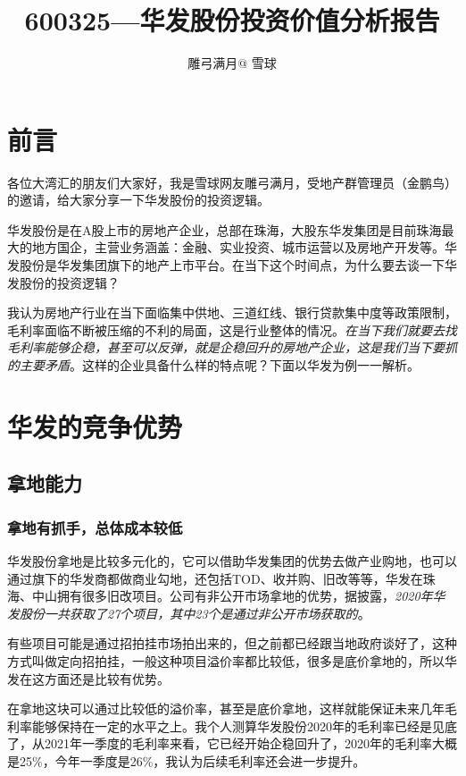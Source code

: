 \documentclass[a4paper,12pt,lang=cn,fontset = windows]{elegantpaper} %
\title{600325—华发股份投资价值分析报告} %
\author{雕弓满月@ 雪球}
\date{\zhtoday}
\begin{document}
\maketitle
\section{前言}

各位大湾汇的朋友们大家好，我是雪球网友雕弓满月，受地产群管理员（金鹏鸟）的邀请，给大家分享一下华发股份的投资逻辑。

华发股份是在A股上市的房地产企业，总部在珠海，大股东华发集团是目前珠海最大的地方国企，主营业务涵盖：金融、实业投资、城市运营以及房地产开发等。华发股份是华发集团旗下的地产上市平台。在当下这个时间点，为什么要去谈一下华发股份的投资逻辑？

我认为房地产行业在当下面临集中供地、三道红线、银行贷款集中度等政策限制，毛利率面临不断被压缩的不利的局面，这是行业整体的情况。\emph{在当下我们就要去找毛利率能够企稳，甚至可以反弹，就是企稳回升的房地产企业，这是我们当下要抓的主要矛盾}。这样的企业具备什么样的特点呢？下面以华发为例一一解析。



\section{华发的竞争优势}

\subsection{拿地能力}

\subsubsection{拿地有抓手，总体成本较低}

华发股份拿地是比较多元化的，它可以借助华发集团的优势去做产业购地，也可以通过旗下的华发商都做商业勾地，还包括TOD、收并购、旧改等等，华发在珠海、中山拥有很多旧改项目。公司有非公开市场拿地的优势，据披露，\emph{2020年华发股份一共获取了27个项目，其中23个是通过非公开市场获取的}。

有些项目可能是通过招拍挂市场拍出来的，但之前都已经跟当地政府谈好了，这种方式叫做定向招拍挂，一般这种项目溢价率都比较低，很多是底价拿地的，所以华发在这方面还是比较有优势。

在拿地这块可以通过比较低的溢价率，甚至是底价拿地，这样就能保证未来几年毛利率能够保持在一定的水平之上。我个人测算华发股份2020年的毛利率已经是见底了，从2021年一季度的毛利率来看，它已经开始企稳回升了，2020年的毛利率大概是25\%，今年一季度是26\%，我认为后续毛利率还会进一步提升。
\end{document}
